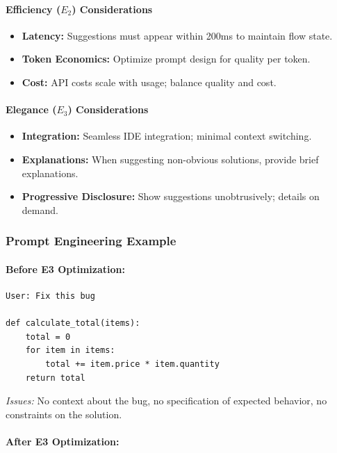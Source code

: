 \paragraph{Efficiency ($E_2$) Considerations}

\begin{itemize}[leftmargin=2em]
    \item \textbf{Latency:} Suggestions must appear within 200ms to maintain flow state.
    \item \textbf{Token Economics:} Optimize prompt design for quality per token.
    \item \textbf{Cost:} API costs scale with usage; balance quality and cost.
\end{itemize}

\paragraph{Elegance ($E_3$) Considerations}

\begin{itemize}[leftmargin=2em]
    \item \textbf{Integration:} Seamless IDE integration; minimal context switching.
    \item \textbf{Explanations:} When suggesting non-obvious solutions, provide brief explanations.
    \item \textbf{Progressive Disclosure:} Show suggestions unobtrusively; details on demand.
\end{itemize}

\subsubsection{Prompt Engineering Example}

\paragraph{Before E3 Optimization:}

\begin{verbatim}
User: Fix this bug

def calculate_total(items):
    total = 0
    for item in items:
        total += item.price * item.quantity
    return total
\end{verbatim}

\textit{Issues:} No context about the bug, no specification of expected behavior, no constraints on the solution.

\paragraph{After E3 Optimization:}

